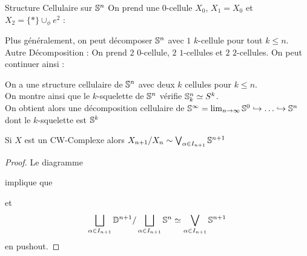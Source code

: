 \documentclass{cours}
\begin{document}
\begin{propositionfr}{Structure Cellulaire sur $\S^{n}$}{}
    On prend une $0$-cellule $X_{0}$, $X_{1} = X_{0}$ et $X_{2} = \{*\} \cup_{\phi} e^{2}$ : 
    \begin{center}
    \end{center}
    Plus généralement, on peut décomposer $\S^{n}$ avec $1$ $k$-cellule pour tout $k \leq n$.\\
    Autre Décomposition : On prend $2$ $0$-cellule, $2$ $1$-cellules et $2$ $2$-cellules. On peut continuer ainsi : 
    \begin{center}
    \end{center}
    On a une structure cellulaire de $\S^{n}$ avec deux $k$ cellules pour $k \leq n$. \\
    On montre ainsi que le $k$-squelette de $\S^{n}$ vérifie $\S^{n}_{k} \simeq S^{k}$.\\
    On obtient alors une décomposition cellulaire de $\S^{\infty} = \lim_{n \to \infty} \S^{0} \hookrightarrow \ldots \hookrightarrow \S^{n}$ dont le $k$-squelette est $\S^{k}$
\end{propositionfr}

\begin{propositionfr}{}{}
    Si $X$ est un CW-Complexe alors $X_{n + 1}/X_{n} \sim \bigvee_{\alpha \in I_{n + 1}}\S^{n + 1}$
\end{propositionfr}
\begin{proof}
    Le diagramme 
    \begin{center}
    \end{center}
    implique que 
    \begin{center}
    \end{center}
    et 
    \[
        \bigsqcup_{\alpha \in I_{n + 1}} \D^{n + 1} / \bigsqcup_{\alpha \in I_{n + 1}} \S^{n} \simeq \bigvee_{\alpha \in I_{n + 1}} \S^{n + 1}
    \]
    en pushout.
\end{proof}
\end{document}
